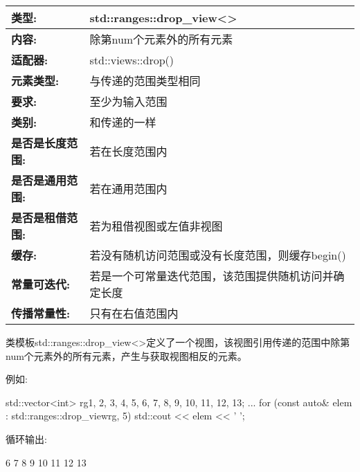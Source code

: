 \begin{longtable}[c]{|l|l|}
\hline
\textbf{类型:}                 & std::ranges::drop\_view\textless{}\textgreater{} \\ \hline
\endfirsthead
%
\endhead
%
\textbf{内容:}              & 除第num个元素外的所有元素      \\ \hline
\textbf{适配器:}              & std::views::drop()                               \\ \hline
\textbf{元素类型:}         & 与传递的范围类型相同                       \\ \hline
\textbf{要求:}             & 至少为输入范围                             \\ \hline
\textbf{类别:}             & 和传递的一样                                   \\ \hline
\textbf{是否是长度范围:}       & 若在长度范围内                              \\ \hline
\textbf{是否是通用范围:}      & 若在通用范围内                               \\ \hline
\textbf{是否是租借范围:} & 若为租借视图或左值非视图                           \\ \hline
\textbf{缓存:}            & 若没有随机访问范围或没有长度范围，则缓存begin()          \\ \hline
\textbf{常量可迭代:}    & 若是一个可常量迭代范围，该范围提供随机访问并确定长度 \\ \hline
\textbf{传播常量性:} & 只有在右值范围内                          \\ \hline
\end{longtable}

类模板std::ranges::drop\_view<>定义了一个视图，该视图引用传递的范围中除第num个元素外的所有元素，产生与获取视图相反的元素。

例如:

\begin{cpp}
std::vector<int> rg{1, 2, 3, 4, 5, 6, 7, 8, 9, 10, 11, 12, 13};
...
for (const auto& elem : std::ranges::drop_view{rg, 5}) {
	std::cout << elem << ' ';
}
\end{cpp}

循环输出:

\begin{shell}
6 7 8 9 10 11 12 13
\end{shell}

